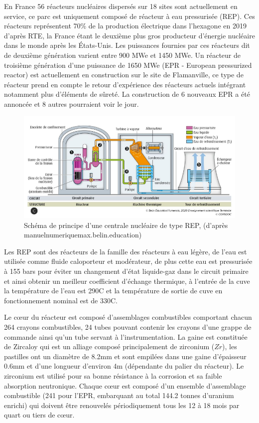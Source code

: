 \documentclass[a4paper,11pt,fleqn]{report}    %
\begin{document}
En France 56 réacteurs nucléaires dispersés sur 18 sites sont actuellement en service, ce parc est uniquement composé de réacteur à eau pressurisée (REP). Ces réacteurs représentent 70\% de la production électrique dans l'hexagone en 2019 d'après RTE, la France étant le deuxième plus gros producteur d'énergie nucléaire dans le monde après les États-Unis. Les puissances fournies par ces réacteurs dit de deuxième génération varient entre 900 MWe et 1450 MWe. Un réacteur de troisième génération d'une puissance de 1650 MWe (EPR - European pressurized reactor) est actuellement en construction sur le site de Flamanville, ce type de réacteur prend en compte le retour d'expérience des réacteurs actuels intégrant notamment plus d'éléments de sûreté. La construction de 6 nouveaux EPR a été annoncée et 8 autres pourraient voir le jour. \\

\begin{figure}[h!]
	\centering
	\includegraphics[width=0.8\linewidth]{figure/sch_centrale1}
	\caption[Schéma de principe d'une centrale nucléaire de type REP]{Schéma de principe d'une centrale nucléaire de type REP, (d'après manuelnumeriquemax.belin.education)}
	\label{fig:schcentrale1}
\end{figure} 
Les REP sont des réacteurs de la famille des réacteurs à eau légère, de l'eau est utilisée comme fluide caloporteur et modérateur, de plus cette eau est pressurisée à 155 bars pour éviter un changement d'état liquide-gaz dans le circuit primaire et ainsi obtenir un meilleur coefficient d'échange thermique, à l'entrée de la cuve la température de l'eau est 290\textdegree C et la température de sortie de cuve en fonctionnement nominal est de 330\textdegree C.

Le c\oe ur du réacteur est composé d'assemblages combustibles comportant chacun 264 crayons combustibles, 24 tubes pouvant contenir les crayons d'une grappe de commande ainsi qu'un tube servant à l'instrumentation. La gaine est constituée de Zircaloy qui est un alliage composé principalement de zirconium ($Zr$), les pastilles ont un diamètre de 8.2mm et sont empilées dans une gaine d'épaisseur 0.6mm et d'une longueur d'environ 4m (dépendante du palier du réacteur). Le zirconium est utilisé pour sa bonne résistance à la corrosion et sa faible absorption neutronique. Chaque c\oe ur est composé d'un ensemble d'assemblage combustible (241 pour l'EPR, embarquant au total 144.2 tonnes d'uranium enrichi) qui doivent être renouvelés périodiquement tous les 12 à 18 mois par quart ou tiers de c\oe ur.
\end{document}
